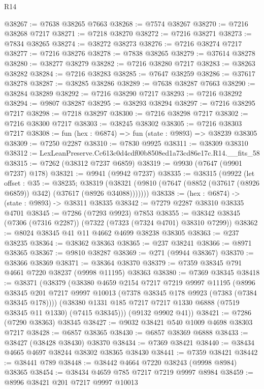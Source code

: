\begin{lexlean}{R14}
\begin{coremodule}
@38267 := @7638 @38265 @7663
@38268 := @7574 @38267
@38270 := @7216 @38268 @7217
@38271 := @7218 @38270
@38272 := @7216 @38271
@38273 := @7834 @38265
@38274 := @38272 @38273
@38276 := @7216 @38274 @7217
@38277 := @7216 @38276
@38278 := @7838 @38265
@38279 := @37614 @38278
@38280 := @38277 @38279
@38282 := @7216 @38280 @7217
@38283 := @38263 @38282
@38284 := @7216 @38283
@38285 := @7647 @38259
@38286 := @37617 @38278
@38287 := @38285 @38286
@38289 := @7638 @38287 @7663
@38290 := @38284 @38289
@38292 := @7216 @38290 @7217
@38293 := @7216 @38292
@38294 := @9807 @38287
@38295 := @38293 @38294
@38297 := @7216 @38295 @7217
@38298 := @7218 @38297
@38300 := @7216 @38298 @7217
@38302 := @7216 @38300 @7217
@38303 := @38245 @38302
@38305 := @7216 @38303 @7217
@38308 := fun (hex : @6874) => fun (state : @9893) => @38239 @38305
@38309 := @7250 @2287
@38310 := @7830 @9925
@38311 := @38309 @38310
@38312 := LexLeanPreserve.Cc613c0d4cdf00b8508ed1a73cd86e17c.R14.__fits_58
@38315 := @7262 (@38312 @7237 @6859)
@38319 := @9930 (@7647 (@9901 @7237) @178)
@38321 := @9941 (@9942 @7237)
@38335 := @38315
    (@9922
      (let offset : @35 := @38235;
      @38319 (@38321 (@9810 (@7647 (@8852 (@37617 (@8926 @6859)) @342) (@37617 (@8926 @34088)))))))
@38338 := (hex : @6874) -> (state : @9893) -> @38311 @38335
@38342 := @7279 @2287 @38310 @38335 @4701
@38345 := @7286 (@7293 @9923) @7853
@38355 := @38342 @38345 (@7306 (@7316 @2287)) (@7322 (@7323 (@7324 @4701) @38310 @7299))
@38362 := @8024 @38345 @41 @11 @4662 @4699 @38238 @38305
@38363 := @237 @38235
@38364 := @38362 @38363
@38365 := @237 @38241
@38366 := @8971 @38365
@38367 := @9810 @38287
@38369 := @271 (@9944 @38367)
@38370 := @38366 @38369
@38371 := @38364 @38370
@38379 := @7359 @38345 @791 @4661 @7220 @38237 (@9998 @11195) @38363
@38380 := @7369 @38345
@38418 := @38371
    (@38379
      (@38380
        @4659
        @2154
        @7217
        @7219
        @9997
        @11195
        (@8996 @38345 @201 @7217 @9997 @10013 (@7378 @38345 @178 @9923 (@7383 (@7384 @38345 @178))))
        (@38380 @1331 @185 @7217 @7217 @1330 @6888 (@7519 @38345 @11 @1330) (@7415 @38345)))
      (@9132 @9902 @41))
@38421 := @7286 (@7290 @38363) @38345
@38427 := @9032 @38421 @540 @1009 @4698 @38303 @7217
@38428 := @6857 @38365
@38430 := @6857 @38369 @6888
@38433 := @38427 (@38428 @38430) @38370
@38434 := @7369 @38421
@38440 := @38434 @4665 @4697 @38244 @38302 @38365 @38430
@38441 := @7359 @38421
@38442 := @38441 @789
@38448 := @38442 @4664 @7220 @38243 (@9998 @8984) @38365
@38454 := @38434 @4659 @785 @7217 @7219 @9997 @8984
@38459 := @8996 @38421 @201 @7217 @9997 @10013

\end{coremodule}
\end{lexlean}
